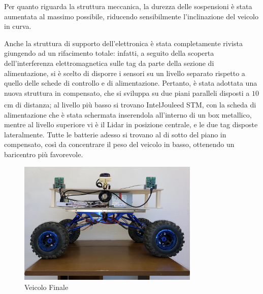 \bigskip

Per quanto riguarda la struttura meccanica, la durezza delle sospensioni è stata aumentata al massimo possibile, riducendo sensibilmente l’inclinazione del veicolo in curva.

\bigskip

Anche la struttura di supporto dell’elettronica è stata completamente rivista giungendo ad un rifacimento totale: infatti, a seguito della scoperta dell’interferenza elettromagnetica sulle tag da parte della sezione di alimentazione, si è scelto di disporre i sensori su un livello separato rispetto a quello delle schede di controllo e di alimentazione.
Pertanto, è stata adottata una nuova struttura in compensato, che si sviluppa su due piani paralleli disposti a $10$cm di distanza; al livello più basso si trovano Intel\textsuperscript\textregistered Joule\texttrademark \hspace{1mm}ed STM\textsuperscript\textregistered, con la scheda di alimentazione che è stata schermata inserendola all’interno di un box metallico, mentre al livello superiore vi è il Lidar in posizione centrale, e le due tag disposte lateralmente. Tutte le batterie adesso si trovano al di sotto del piano in compensato, così da concentrare il peso del veicolo in basso, ottenendo un baricentro più favorevole.

\bigskip

\begin{figure}[h] 
\centering    
\includegraphics[width=0.77\textwidth]{Capitolo1/Figs/charlie.png}
\caption[Veicolo finale]{Veicolo Finale}
\label{fig:veicolo_finale}
\end{figure}